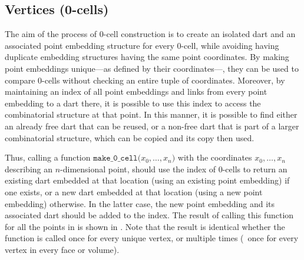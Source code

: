 \subsection{Vertices (0-cells)}
\label{ss:incremental-vertices}

The aim of the process of 0-cell construction is to create an isolated dart and an associated point embedding structure for every 0-cell, while avoiding having duplicate embedding structures having the same point coordinates.
By making point embeddings unique---as defined by their coordinates---, they can be used to compare 0-cells without checking an entire tuple of coordinates.
Moreover, by maintaining an index of all point embeddings and links from every point embedding to a dart there, it is possible to use this index to access the combinatorial structure at that point.
In this manner, it is possible to find either an already free dart that can be reused, or a non-free dart that is part of a larger combinatorial structure, which can be copied and its copy then used.

Thus, calling a function $\texttt{make\_0\_cell(}x_0, \ldots, x_n\texttt{)}$ with the coordinates $x_0, \ldots, x_n$ describing an $n$-dimensional point, should use the index of 0-cells to return an existing dart embedded at that location (using an existing point embedding) if one exists, or a new dart embedded at that location (using a new point embedding) otherwise.
In the latter case, the new point embedding and its associated dart should be added to the index.
The result of calling this function for all the points in  is shown in .
Note that the result is identical whether the function is called once for every unique vertex, or multiple times (\eg\ once for every vertex in every face or volume).

